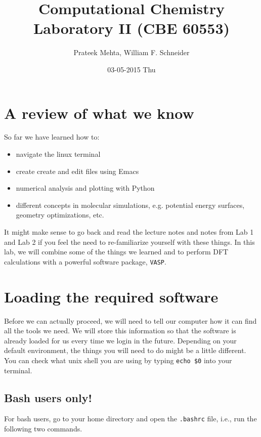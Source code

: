 \documentclass[11pt]{article}
\author{Prateek Mehta, William F. Schneider}
\date{03-05-2015 Thu}
\title{Computational Chemistry Laboratory II (CBE 60553)}
\begin{document}
\maketitle


\section{A review of what we know}
\label{sec-1}

So far we have learned how to:

\begin{itemize}
\item navigate the linux terminal

\item create create and edit files using Emacs

\item numerical analysis and plotting with Python

\item different concepts in molecular simulations, e.g. potential energy surfaces, geometry optimizations, etc.
\end{itemize}

It might make sense to go back and read the lecture notes and notes from Lab 1 and Lab 2 if you feel the need to re-familiarize yourself with these things. In this lab, we will combine some of the things we learned and to perform DFT calculations with a powerful software package, \texttt{VASP}. 


\section{Loading the required software}
\label{sec-2}

Before we can actually proceed, we will need to tell our computer how it can find all the tools we need. We will store this information so that the software is already loaded for us every time we login in the future. Depending on your default environment, the things you will need to do might be a little different. You can check what unix shell you are using by typing \verb~echo $0~ into your terminal. 

\subsection{Bash users only!}
\label{sec-2-1}

For bash users, go to your home directory and open the \texttt{.bashrc} file, i.e., run the following two commands. 
\end{document}
